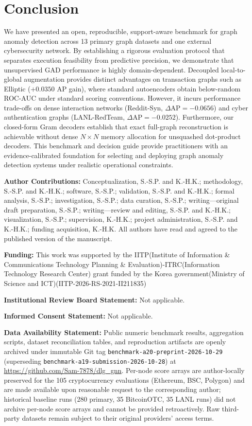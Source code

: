 \documentclass[11pt,a4paper]{article}
\newcommand{\authorcontributions}[1]{\par\medskip\noindent\textbf{Author Contributions: }#1}
\newcommand{\funding}[1]{\par\smallskip\noindent\textbf{Funding: }#1}
\newcommand{\institutionalreview}[1]{\par\smallskip\noindent\textbf{Institutional Review Board Statement: }#1}
\newcommand{\informedconsent}[1]{\par\smallskip\noindent\textbf{Informed Consent Statement: }#1}
\newcommand{\dataavailability}[1]{\par\smallskip\noindent\textbf{Data Availability Statement: }#1}
\begin{document}
\section{Conclusion}
\label{sec:conclusion}
We have presented an open, reproducible, support-aware benchmark for graph anomaly detection across 13 primary graph datasets and one external cybersecurity network. By establishing a rigorous evaluation protocol that separates execution feasibility from predictive precision, we demonstrate that unsupervised GAD performance is highly domain-dependent. Decoupled local-to-global augmentation provides distinct advantages on transaction graphs such as Elliptic ($+0.0350$ AP gain), where standard autoencoders obtain below-random ROC-AUC under standard scoring conventions. However, it incurs performance trade-offs on dense interaction networks (Reddit-Syn, $\Delta\mathrm{AP} = -0.0656$) and cyber authentication graphs (LANL-RedTeam, $\Delta\mathrm{AP} = -0.0252$). Furthermore, our closed-form Gram decoders establish that exact full-graph reconstruction is achievable without dense $N \times N$ memory allocation for unsquashed dot-product decoders. This benchmark and decision guide provide practitioners with an evidence-calibrated foundation for selecting and deploying graph anomaly detection systems under realistic operational constraints.

\vspace{6pt}

\authorcontributions{Conceptualization, S.-S.P. and K.-H.K.; methodology, S.-S.P. and K.-H.K.; software, S.-S.P.; validation, S.-S.P. and K.-H.K.; formal analysis, S.-S.P.; investigation, S.-S.P.; data curation, S.-S.P.; writing---original draft preparation, S.-S.P.; writing---review and editing, S.-S.P. and K.-H.K.; visualization, S.-S.P.; supervision, K.-H.K.; project administration, S.-S.P. and K.-H.K.; funding acquisition, K.-H.K. All authors have read and agreed to the published version of the manuscript.}

\funding{This work was supported by the IITP(Institute of Information \& Communications Technology Planning \& Evaluation)-ITRC(Information Technology Research Center) grant funded by the Korea government(Ministry of Science and ICT)(IITP-2026-RS-2021-II211835)}

\institutionalreview{Not applicable.}

\informedconsent{Not applicable.}

\dataavailability{Public numeric benchmark results, aggregation scripts, dataset reconciliation tables, and reproduction artifacts are openly archived under immutable Git tag \texttt{benchmark-a20-preprint-2026-10-29} (superseding \texttt{benchmark-a19-submission-2026-10-28}) at \url{https://github.com/Sam-7878/dlg_gnn}. Per-node score arrays are author-locally preserved for the 105 cryptocurrency evaluations (Ethereum, BSC, Polygon) and are made available upon reasonable request to the corresponding author; historical baseline runs (280 primary, 35 BitcoinOTC, 35 LANL runs) did not archive per-node score arrays and cannot be provided retroactively. Raw third-party datasets remain subject to their original providers' access terms.}
\end{document}
